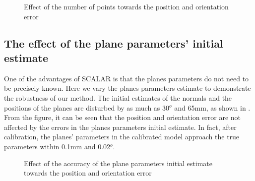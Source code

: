 \begin{figure}[h]
  \centering
  \caption{Effect of the number of points towards the position and orientation error} 
  \label{fig:num_of_points}
\end{figure}


\subsection{The effect of the plane parameters' initial estimate}
\label{sec:plane_params}
One of the advantages of SCALAR is that the planes parameters do not need to be precisely known. Here we vary the planes parameters estimate to demonstrate the robustness of our method. The initial estimates of the normals and the positions of the planes are disturbed by as much as 30$^o$ and 65mm, as shown in . From the figure, it can be seen that the position and orientation error are not affected by the errors in the planes parameters initial estimate. In fact, after calibration, the planes' parameters in the calibrated model approach the true parameters within 0.1mm and 0.02$^o$.


\begin{figure}[h]
  \centering
  \caption{Effect of the accuracy of the plane parameters initial estimate towards the position and orientation error} 
  \label{fig:plane_params}
\end{figure}



